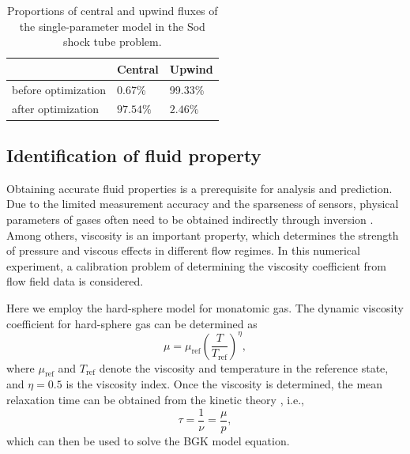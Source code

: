 \documentclass[preprint,3p,12pt,sort&compress]{elsarticle}
\begin{document}
\begin{table}[h]
    \centering
    \caption{Proportions of central and upwind fluxes of the single-parameter model in the Sod shock tube problem.}
    \begin{tabular}{lll}
        \toprule
        & Central & Upwind \\
        \midrule
        before optimization & 0.67\% & 99.33\% \\
        after optimization & $97.54\%$ & $2.46\%$ \\
        \bottomrule
    \end{tabular}
    \label{tab:sod proportion}
\end{table}

\subsection{Identification of fluid property}

Obtaining accurate fluid properties is a prerequisite for analysis and prediction.
Due to the limited measurement accuracy and the sparseness of sensors, physical parameters of gases often need to be obtained indirectly through inversion \cite{liu2019inverse}.
Among others, viscosity is an important property, which determines the strength of pressure and viscous effects in different flow regimes.
In this numerical experiment, a calibration problem of determining the viscosity coefficient from flow field data is considered.

Here we employ the hard-sphere model for monatomic gas.
The dynamic viscosity coefficient for hard-sphere gas can be determined as
\begin{equation}
    \mu = \mu_\mathrm{ref} \left(\frac{T}{T_\mathrm{ref}}\right)^\eta,
\end{equation}
where $\mu_\mathrm{ref}$ and $T_\mathrm{ref}$ denote the viscosity and temperature in the reference state, and $\eta=0.5$ is the viscosity index.
Once the viscosity is determined, the mean relaxation time can be obtained from the kinetic theory \cite{vincenti1966introduction}, i.e.,
\begin{equation}
    \tau = \frac{1}{\nu} =\frac{\mu}{p},
\end{equation}
which can then be used to solve the BGK model equation.
\end{document}
